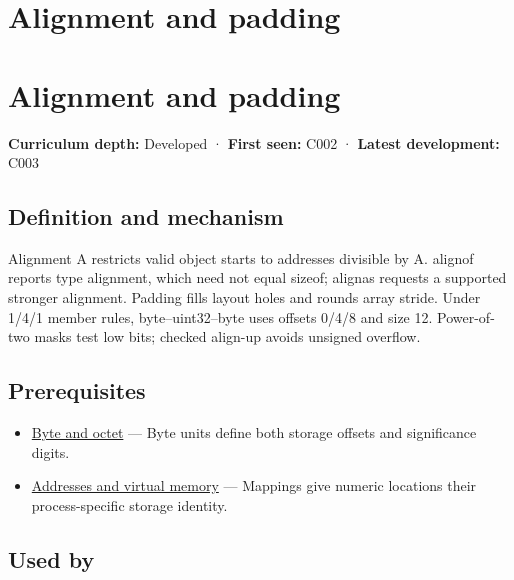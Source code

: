 \hypertarget{appendix-a1f7c53b4742}{}
\section*{Alignment and padding}
\section{Alignment and padding}\label{alignment-and-padding}

\textbf{Curriculum depth:} Developed · \textbf{First seen:} C002 · \textbf{Latest development:} C003

\subsection{Definition and mechanism}\label{definition-and-mechanism}

Alignment A restricts valid object starts to addresses divisible by A. alignof reports type alignment, which need not equal sizeof; alignas requests a supported stronger alignment. Padding fills layout holes and rounds array stride. Under 1/4/1 member rules, byte--uint32--byte uses offsets 0/4/8 and size 12. Power-of-two masks test low bits; checked align-up avoids unsigned overflow.

\subsection{Prerequisites}\label{prerequisites}

\begin{itemize}
\tightlist
\item
  \hyperref[appendix-5bee2df85484]{Byte and octet} --- Byte units define both storage offsets and significance digits.
\item
  \hyperref[appendix-18ee4f913c3c]{Addresses and virtual memory} --- Mappings give numeric locations their process-specific storage identity.
\end{itemize}

\subsection{Used by}\label{used-by}


